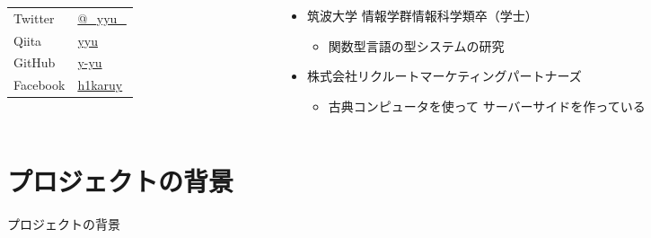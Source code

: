 \begin{frame}
\begin{columns}
\begin{column}{0.3\textwidth}
      \begin{table}[h]
        \begin{tabular}{ll}
          Twitter & \href{https://twitter.com/\_yyu\_}{@\_yyu\_} \\
          Qiita &  \href{https://qiita.com/yyu}{yyu} \\
          GitHub &  \href{https://github.com/y-yu}{y-yu} \\
          Facebook & \href{https://www.facebook.com/h1karuy}{h1karuy} \\
        \end{tabular}
      \end{table}
    \end{column}
    \begin{column}{0.7\textwidth}
      \pause
      \begin{itemize}
        \item 筑波大学 情報学群情報科学類卒（学士）
        \begin{itemize}
          \item 関数型言語の型システムの研究
        \end{itemize}

        \item 株式会社リクルートマーケティングパートナーズ
        \begin{itemize}
          \item 古典コンピュータを使って
          サーバーサイドを作っている
        \end{itemize}
      \end{itemize}
    \end{column}
  \end{columns}
\end{frame}

\section{プロジェクトの背景}

\begin{frame}
  \centering
  {\Huge プロジェクトの背景}
\end{frame}

